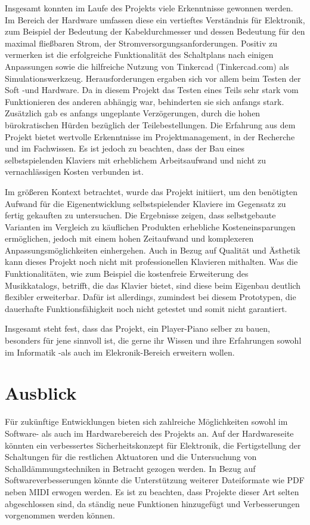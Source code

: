 Insgesamt konnten im Laufe des Projekts viele Erkenntnisse gewonnen werden.
Im Bereich der Hardware umfassen diese ein vertieftes Verständnis für Elektronik, zum Beispiel der Bedeutung der Kabeldurchmesser und dessen Bedeutung für den maximal fließbaren Strom, der Stromversorgungsanforderungen.
Positiv zu vermerken ist die erfolgreiche Funktionalität des Schaltplans nach einigen Anpassungen sowie die hilfreiche Nutzung von Tinkercad (Tinkercad.com) als Simulationswerkzeug.
Herausforderungen ergaben sich vor allem beim Testen der Soft -und Hardware.
Da in diesem Projekt das Testen eines Teils sehr stark vom Funktionieren des anderen abhängig war,
behinderten sie sich anfangs stark.
Zusätzlich gab es anfangs ungeplante Verzögerungen, durch die hohen bürokratischen Hürden bezüglich der Teilebestellungen.
Die Erfahrung aus dem Projekt bietet wertvolle Erkenntnisse im Projektmanagement, in der Recherche und im Fachwissen.
Es ist jedoch zu beachten, dass der Bau eines selbstspielenden Klaviers mit erheblichem Arbeitsaufwand und nicht zu vernachlässigen Kosten verbunden ist.

Im größeren Kontext betrachtet, wurde das Projekt initiiert, um den benötigten Aufwand für die Eigenentwicklung selbstspielender Klaviere im Gegensatz zu fertig gekauften zu untersuchen.
Die Ergebnisse zeigen, dass selbstgebaute Varianten im Vergleich zu käuflichen Produkten erhebliche Kosteneinsparungen ermöglichen, jedoch mit einem hohen Zeitaufwand und komplexeren Anpassungsmöglichkeiten einhergehen.
Auch in Bezug auf Qualität und Ästhetik kann dieses Projekt noch nicht mit professionellen Klavieren mithalten.
Was die Funktionalitäten, wie zum Beispiel die kostenfreie Erweiterung des Musikkatalogs, betrifft, die das Klavier bietet, sind diese beim Eigenbau deutlich flexibler erweiterbar.
Dafür ist allerdings, zumindest bei diesem Prototypen, die dauerhafte Funktionsfähigkeit noch nicht getestet und somit nicht garantiert.

Insgesamt steht fest, dass das Projekt, ein Player-Piano selber zu bauen, besonders für jene sinnvoll ist,
die gerne ihr Wissen und ihre Erfahrungen sowohl im Informatik -als auch im Elekronik-Bereich erweitern wollen.


\section{Ausblick}

Für zukünftige Entwicklungen bieten sich zahlreiche Möglichkeiten sowohl im Software- als auch im Hardwarebereich des Projekts an.
Auf der Hardwareseite könnten ein verbessertes Sicherheitskonzept für Elektronik, die Fertigstellung der Schaltungen für die restlichen Aktuatoren und die Untersuchung von Schalldämmungstechniken in Betracht gezogen werden.
In Bezug auf Softwareverbesserungen könnte die Unterstützung weiterer Dateiformate wie PDF neben MIDI erwogen werden.
Es ist zu beachten, dass Projekte dieser Art selten abgeschlossen sind, da ständig neue Funktionen hinzugefügt und Verbesserungen vorgenommen werden können.

